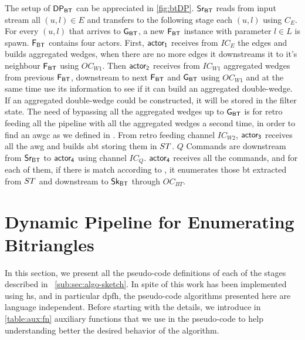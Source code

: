 The setup of $\mathsf{DP_{BT}}$ can be appreciated in \autoref{fig:btDP}. $\mathsf{Sr_{BT}}$ reads from input stream all $(u,l) \in E$ and transfers to the following stage each $(u,l)$ using $C_E$.
For every $(u,l)$ that arrives to $\mathsf{G_{BT}}$, a new $\mathsf{F_{BT}}$ instance with parameter $l \in L$ is spawn. $\mathsf{F_{BT}}$ contains four actors. 
First, $\mathsf{actor_1}$ receives from $IC_E$ the edges and builds aggregated wedges, when there are no more edges it downstreams it to it's neighbour $\mathsf{F_{BT}}$ using $OC_{W1}$. 
Then $\mathsf{actor_2}$ receives from $IC_{W1}$ aggregated wedges from previous $\mathsf{F_{BT}}$, downstream to next $\mathsf{F_{BT}}$ and $\mathsf{G_{BT}}$ using $OC_{W1}$ and at the same time use its information to see 
if it can build an aggregated double-wedge. If an aggregated double-wedge could be constructed, it will be stored in the filter state.
The need of bypassing all the aggregated wedges up to $\mathsf{G_{BT}}$ is for retro feeding all the pipeline with all the aggregated wedges a second time, in order to find an \acrfull{awgc} as we defined in .
From retro feeding channel $IC_{W2}$, $\mathsf{actor_3}$ receives all the \acrshort{awg}  and builds \acrshort{abt} storing them in $ST$. 
$Q$ Commands are downstream from $\mathsf{Sr_{BT}}$ to $\mathsf{actor_4}$ using channel $IC_Q$. $\mathsf{actor_4}$ receives all the commands, and for each of them, if there is match according to , it enumerates those \acrshort{bt} extracted from $ST$ and downstream to $\mathsf{Sk_{BT}}$ through $OC_{BT}$.

\section{Dynamic Pipeline for Enumerating Bitriangles}\label{sub:sec:iebt:dpalgo}
In this section, we present all the pseudo-code definitions of each of the stages described in ~\autoref{sub:sec:algo-sketch}. 
In spite of this work has been implemented using \acrshort{hs}, and in particular \acrshort{dpfh}, the pseudo-code algorithms presented here are language independent.
Before starting with the details, we introduce in \autoref{table:aux:fn} auxiliary functions that we use in the pseudo-code to help understanding better the desired behavior of the algorithm.

